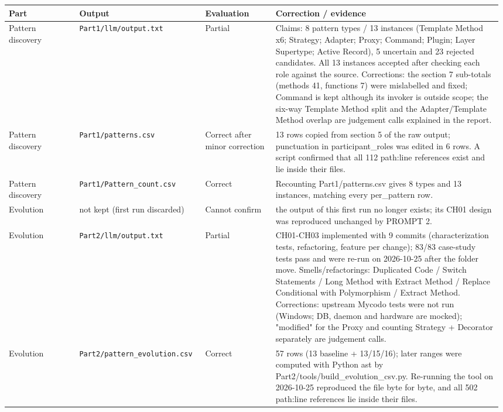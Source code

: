 \documentclass[11pt,a4paper]{article}
\begin{document}
{\small\setlength{\tabcolsep}{3pt}
\begin{longtable}{@{}P{0.14\linewidth}P{0.25\linewidth}P{0.14\linewidth}P{0.45\linewidth}@{}}\toprule
\textbf{Part} & \textbf{Output} & \textbf{Evaluation} & \textbf{Correction / evidence} \\ \midrule\endhead
Pattern discovery & \texttt{Part1/\allowbreak{}llm/\allowbreak{}output.\allowbreak{}txt} & Partial & Claims: 8 pattern types / 13 instances (Template Method x6; Strategy; Adapter; Proxy; Command; Plugin; Layer Supertype; Active Record), 5 uncertain and 23 rejected candidates. All 13 instances accepted after checking each role against the source. Corrections: the section 7 sub-totals (methods 41, functions 7) were mislabelled and fixed; Command is kept although its invoker is outside scope; the six-way Template Method split and the Adapter/Template Method overlap are judgement calls explained in the report. \\
Pattern discovery & \texttt{Part1/\allowbreak{}patterns.\allowbreak{}csv} & Correct after minor correction & 13 rows copied from section 5 of the raw output; punctuation in participant\_roles was edited in 6 rows. A script confirmed that all 112 path:line references exist and lie inside their files. \\
Pattern discovery & \texttt{Part1/\allowbreak{}Pattern\_\allowbreak{}count.\allowbreak{}csv} & Correct & Recounting Part1/patterns.csv gives 8 types and 13 instances, matching every per\_pattern row. \\
Evolution & not kept (first run discarded) & Cannot confirm & the output of this first run no longer exists; its CH01 design was reproduced unchanged by PROMPT 2. \\
Evolution & \texttt{Part2/\allowbreak{}llm/\allowbreak{}output.\allowbreak{}txt} & Partial & CH01-CH03 implemented with 9 commits (characterization tests, refactoring, feature per change); 83/83 case-study tests pass and were re-run on 2026-10-25 after the folder move. Smells/refactorings: Duplicated Code / Switch Statements / Long Method with Extract Method / Replace Conditional with Polymorphism / Extract Method. Corrections: upstream Mycodo tests were not run (Windows; DB, daemon and hardware are mocked); "modified" for the Proxy and counting Strategy + Decorator separately are judgement calls. \\
Evolution & \texttt{Part2/\allowbreak{}pattern\_\allowbreak{}evolution.\allowbreak{}csv} & Correct & 57 rows (13 baseline + 13/15/16); later ranges were computed with Python ast by Part2/tools/build\_evolution\_csv.py. Re-running the tool on 2026-10-25 reproduced the file byte for byte, and all 502 path:line references lie inside their files. \\

\end{longtable}}
\end{document}
